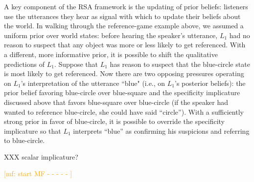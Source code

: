 \documentclass{sp}
\newcommand{\mf}[1]{\textcolor{orange}{[mf: #1]}}
\begin{document}
A key component of the RSA framework is the updating of prior beliefs: listeners use the utterances they hear as signal with which to update their beliefs about the world. In walking through the reference-game example above, we assumed a uniform prior over world states: before hearing the speaker's utterance, $L_1$ had no reason to suspect that any object was more or less likely to get referenced. With a different, more informative prior, it is possible to shift the qualitative predictions of $L_1$. Suppose that $L_1$ has reason to suspect that the blue-circle state is most likely to get referenced. Now there are two opposing pressures operating on $L_1$'s interpretation of the utterance ``blue" (i.e., on $L_1$'s posterior beliefs): the prior belief favoring blue-circle over blue-square and the specificity implicature discussed above that favors blue-square over blue-circle (if the speaker had wanted to reference blue-circle, she could have said ``circle''). With a sufficiently strong prior in favor of blue-circle, it is possible to override the specificity implicature so that $L_1$ interprets ``blue'' as confirming his suspicions and referring to blue-circle.

XXX scalar implicature?

\mf{start MF - - - - - }
\end{document}
